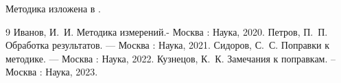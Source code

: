 Методика изложена в \cite{ivanov}.

\begin{thebibliography}{9}
   Иванов, И.~И. Методика измерений.- Москва : Наука, 2020. %
   Петров, П.~П. Обработка результатов. --- Москва : Наука, 2021. %
   Сидоров, С.~С. Поправки к методике. — Москва : Наука, 2022. %
   Кузнецов, К.~К. Замечания к поправкам. –Москва : Наука, 2023. %
\end{thebibliography}
